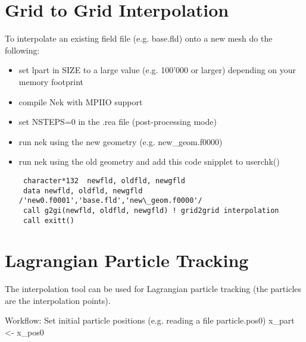 \section{Grid to Grid Interpolation}

To interpolate an existing field file (e.g. base.fld) onto a new mesh do the following:
\begin{itemize}
\item set lpart in SIZE to a large value (e.g. 100'000 or larger) depending on your memory footprint
\item    compile Nek with MPIIO support
\item    set NSTEPS=0 in the .rea file (post-processing mode)
\item    run nek using the new geometry (e.g. new\_geom.f0000)
\item    run nek using the old geometry and add this code snipplet to userchk() 
\begin{verbatim}
 character*132  newfld, oldfld, newgfld
 data newfld, oldfld, newgfld /'new0.f0001','base.fld','new\_geom.f0000'/
 call g2gi(newfld, oldfld, newgfld) ! grid2grid interpolation
 call exitt()
\end{verbatim}
\end{itemize}
    

\section{Lagrangian Particle Tracking}

The interpolation tool can be used for Lagrangian particle tracking (the particles are the interpolation points).

Workflow: Set initial particle positions (e.g. reading a file particle.pos0) x\_part <- x\_pos0 

